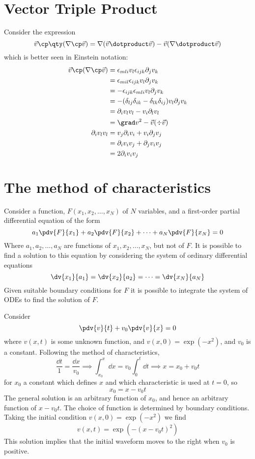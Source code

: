 \section{Vector Triple Product}
\label{sec:vect-triple-prod}

Consider the expression 
\[ \vec{v} \cp \qty( \nabla \cp \vec{v} ) = 
   \nabla ( \vec{v} \dotproduct \vec{v}) 
 - \vec{v} (\nabla \dotproduct \vec{v}) \]
which is better seen in Einstein notation:
\begin{align*}
  \vec{v} \cp (\nabla \cp \vec{v}) &= \epsilon_{mli} v_l \epsilon_{ijk} \partial_j v_k \\
&= \epsilon_{mil} \epsilon_{ijk} v_l \partial_j v_k \\
&= - \epsilon_{ijk} \epsilon_{mli} v_l \partial_j v_k \\
&= - (\delta_{lj} \delta_{ik} - \delta_{lk} \delta_{ij}) v_l \partial_j v_k\\
&= \partial_i v_l v_l - v_i \partial_l v_l \\
&= \grad v^2 - \vec{v} (\div\vec{v}) \\
\partial_i v_l v_l &= v_j \partial_i v_i + v_i \partial_j v_j \\
&= \partial_i v_i v_j + \partial_j v_i v_j \\
&= 2 \partial_i v_i v_j
\end{align*}

\section{The method of characteristics}
\label{sec:meth-char}

Consider a function, $F(x_1, x_2, \dots, x_N)$ of $N$ variables, and a first-order
partial differential equation of the form
\[ a_1 \pdv{F}{x_1} + a_2 \pdv{F}{x_2} + \dots + a_N \pdv{F}{x_N} =
0 \] Where $a_1, a_2, \dots, a_N$ are functions of $x_1, x_2, \dots,
x_N$, but not of $F$. It is possible to find a solution to this
equation by considering the system of ordinary differential equations
\[ \dv{x_1}{a_1} = \dv{x_2}{a_2} = \dots = \dv{x_N}{a_N} \] Given
suitable boundary conditions for $F$ it is possible to integrate the
system of ODEs to find the solution of $F$.

\begin{example}
  Consider 
  \[ \pdv{v}{t} + v_0 \pdv{v}{x} = 0 \] where $v(x,t)$ is some unknown
  function, and $v(x,0) = \exp(-x^2)$, and $v_0$ is a
  constant. Following the method of characteristics,
  \[ \frac{\dd{t}}{1} = \frac{\dd{x}}{v_0} \implies \int_{x_0}^x
  \dd{x} = v_0 \int_0^t \dd{t} \implies x = x_0 + v_0 t \] for $x_0$ a
  constant which defines $x$ and which characteristic is used at
  $t=0$, so \[ x_0 = x - v_0 t \] The general solution is an arbitrary
  function of $x_0$, and hence an arbitrary function of $x-v_0 t$. The
  choice of function is determined by boundary conditions.
Taking the initial condition $v(x,0) = \exp(-x^2)$ we find
\[ v(x,t) = \exp(-(x-v_0 t)^2) \] This solution implies that the
initial waveform moves to the right when $v_0$ is positive.
\end{example}


